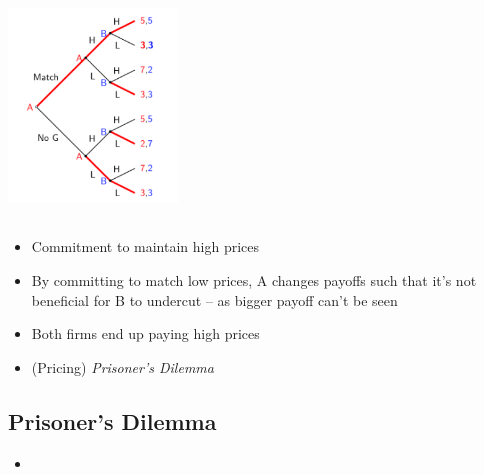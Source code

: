 \documentclass[11pt, english]{article}
\begin{document}
	\begin{center}
		\includegraphics[width=4.5cm,height=6cm]{EC315-IMG/5.png}
	\end{center}

	\begin{itemize}
	\setlength\itemsep{0cm}
		\item Commitment to maintain high prices
		\item By committing to match low prices, A changes payoffs such that it’s not beneficial for B to undercut – as bigger payoff can’t be seen 
		\item Both firms end up paying high prices
		\item (Pricing) \textit{Prisoner’s Dilemma}
	\end{itemize}

	\subsection{Prisoner's Dilemma}

	\begin{itemize}
	\setlength\itemsep{0cm}
		\item 
	\end{itemize}
\end{document}
